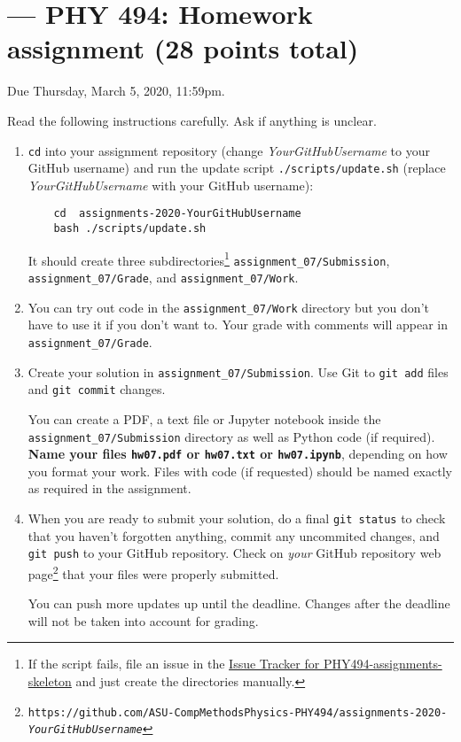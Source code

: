 \documentclass[paper=letter]{scrartcl}
\newcommand{\anumber}{7}
\newcommand{\anum}{0\anumber}
\begin{document}

\setcounter{section}{\anumber}
\addtocounter{section}{-1}
\section{ --- PHY 494: Homework assignment (28 points total)}

\noindent Due Thursday, March 5, 2020, 11:59pm.

\noindent
Read the following instructions carefully. Ask if anything is unclear.
\begin{enumerate}
\item \texttt{cd} into your assignment repository (change
  \emph{YourGitHubUsername} to your GitHub username) and run the
  update script \texttt{./scripts/update.sh} (replace
  \emph{YourGitHubUsername} with your GitHub username):
  \begin{verbatim}
    cd  assignments-2020-YourGitHubUsername
    bash ./scripts/update.sh
  \end{verbatim}
  It should create three subdirectories\footnote{If the script fails,
    file an issue in the
    \href{https://github.com/ASU-CompMethodsPhysics-PHY494/PHY494-assignments-skeleton/issues}{Issue
      Tracker for PHY494-assignments-skeleton} and just create the
    directories manually.} \texttt{assignment\_\anum/Submission},
  \texttt{assignment\_\anum/Grade}, and
  \texttt{assignment\_\anum/Work}.
\item You can try out code in the \texttt{assignment\_\anum/Work}
  directory but you don't have to use it if you don't want to. Your
  grade with comments will appear in
  \texttt{assignment\_\anum/Grade}.
\item Create your solution in
  \texttt{assignment\_\anum/Submission}. Use Git to \texttt{git
    add} files and \texttt{git commit} changes.

  You can create a PDF, a text file or Jupyter notebook inside the
  \texttt{assignment\_\anum/Submission} directory as well as Python
  code (if required). \textbf{Name your files \texttt{hw\anum.pdf} or
    \texttt{hw\anum.txt} or \texttt{hw\anum.ipynb}}, depending on how
  you format your work. Files with code (if requested) should be named
  exactly as required in the assignment.
\item When you are ready to submit your solution, do a final
  \texttt{git status} to check that you haven't forgotten anything,
  commit any uncommited changes, and \texttt{git push} to your GitHub
  repository. Check on \emph{your} GitHub repository web
  page\footnote{\texttt{https://github.com/ASU-CompMethodsPhysics-PHY494/assignments-2020-\emph{YourGitHubUsername}}}
  that your files were properly submitted.

  You can push more updates up until the deadline. Changes after the
  deadline will not be taken into account for grading.
\end{enumerate}
\end{document}
